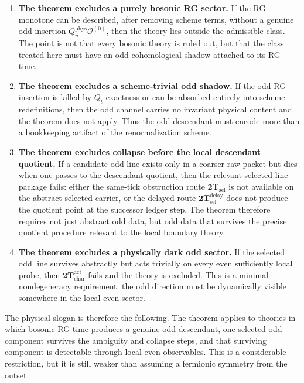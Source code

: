 \documentclass[
  aps,
  prd,
  onecolumn,
  notitlepage,
  nofootinbib,
  superscriptaddress,
  10pt
]{revtex4-2}
\theoremstyle{definition}
\theoremstyle{plain}
\begin{document}
\begin{enumerate}[label=\textnormal{(\arabic*)},leftmargin=*,itemsep=0.4em]
  \item \textbf{The theorem excludes a purely bosonic RG sector.}  If the RG
  monotone can be
  described, after removing scheme terms, without a genuine odd insertion
  \(Q_u^{\mathrm{phys}}\mathcal O^{(0)}\), then the theory lies outside the
  admissible class.  The point is not that every bosonic theory is ruled out,
  but that the class treated here must have an odd cohomological shadow
  attached to its RG time.

  \item \textbf{The theorem excludes a scheme-trivial odd shadow.}  If the odd
  RG insertion is
  killed by \(Q_t\)-exactness or can be absorbed entirely into scheme
  redefinitions, then the odd channel carries no invariant physical content and
  the theorem does not apply.  Thus the odd descendant must encode more than a
  bookkeeping artifact of the renormalization scheme.

  \item \textbf{The theorem excludes collapse before the local descendant
  quotient.}  If a candidate odd line
  exists only in a coarser raw packet but dies when one passes to the
  descendant quotient, then the relevant selected-line package fails: either
  the same-tick obstruction route \(\mathbf{2T}_{\mathrm{sel}}\) is not
  available on the abstract selected carrier, or the delayed route
  \(\mathbf{2T}_{\mathrm{sel}}^{\mathrm{delay}}\) does not produce the
  quotient point at the successor ledger step.  The theorem therefore requires not just
  abstract odd data, but odd data that survives the precise quotient procedure
  relevant to the local boundary theory.

  \item \textbf{The theorem excludes a physically dark odd sector.}  If the
  selected odd line
  survives abstractly but acts trivially on every even sufficiently local
  probe, then \(\mathbf{2T}_{\mathrm{char}}^{\mathrm{act}}\) fails and the
  theory is excluded.  This is a minimal nondegeneracy requirement: the odd
  direction must be dynamically visible somewhere in the local even sector.
\end{enumerate}

The physical slogan is therefore the following.  The theorem applies to
theories in which bosonic RG time produces a genuine odd descendant, one
selected odd component survives the ambiguity and collapse steps, and that
surviving component is detectable through local even observables.  This is a
considerable restriction, but it is still weaker than assuming a fermionic symmetry
from the outset.
\end{document}
